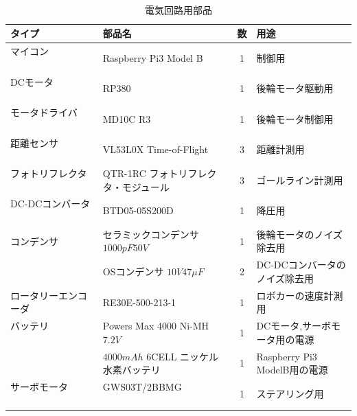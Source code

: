 \begin{table}
　   \caption{電気回路用部品}
　   \label{tab::circuit_parts}
　   \begin{center}
　   \footnotesize
　　　\begin{tabular}{ | l | l | c || l |}\hline
タイプ          　　　　　&部品名              　　　                        &数&用途   \\ \hline\hline
マイコン        　　　　　&Raspberry Pi3 Model B    　                       &1&制御用          　\\ \hline
DCモータ        　　　　　&RP380    　　　　　　　　                    　  &1&後輪モータ駆動用   \\    \hline
モータドライバ        　　&MD10C R3   　　                                   &1&後輪モータ制御用   \\ \hline
距離センサ        　　　　&VL53L0X Time-of-Flight 　                         &3&距離計測用   \\ \hline
フォトリフレクタ        　&QTR-1RC フォトリフレクタ・モジュール              &3&ゴールライン計測用   \\ \hline
DC-DCコンバータ        　 &BTD05-05S200D                                     &1&降圧用   \\ \hline
コンデンサ                &セラミックコンデンサ$1000\unit{pF}50\unit{V}$ &1&後輪モータのノイズ除去用   \\ \cline{2-4}
                          &OSコンデンサ $10\unit{V}47\unit{\mu F}$                          &2&DC-DCコンバータのノイズ除去用    \\ \hline
ロータリーエンコーダ　　　&RE30E-500-213-1                                   &1&ロボカーの速度計測用   \\ \hline
バッテリ        　　　　　&Powers Max 4000 Ni-MH $7.2\unit{V}$                        &1&DCモータ,サーボモータ用の電源\\ \cline{2-4}
                          &$4000\unit{mAh}$ 6CELL ニッケル水素バッテリ                &1&Raspberry Pi3 ModelB用の電源    \\ \hline
サーボモータ        　　　&GWS03T/2BBMG 　　　　　　　　                      　&1&ステアリング用   \\    \hline

	   \end{tabular}
	\end{center}
\end{table}





